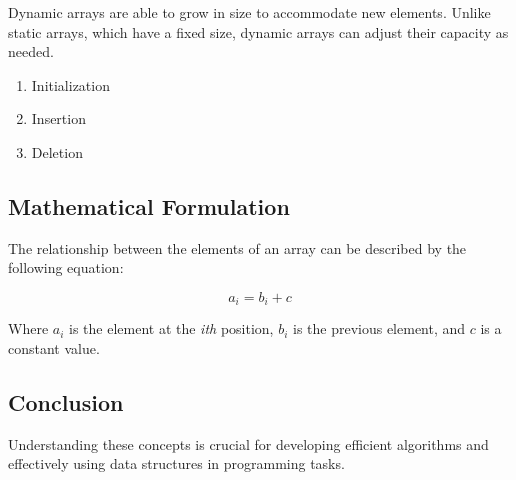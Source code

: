 Dynamic arrays are able to grow in size to accommodate new elements. Unlike static arrays, which have a fixed size, dynamic arrays can adjust their capacity as needed.

\begin{enumerate}
	\item Initialization
	\item Insertion
	\item Deletion
\end{enumerate}

\subsection*{Mathematical Formulation}

The relationship between the elements of an array can be described by the following equation:

\[
a_i = b_i + c
\]

Where $a_i$ is the element at the \textit{ith} position, $b_i$ is the previous element, and $c$ is a constant value.

\subsection*{Conclusion}

Understanding these concepts is crucial for developing efficient algorithms and effectively using data structures in programming tasks.

\hrulefill

